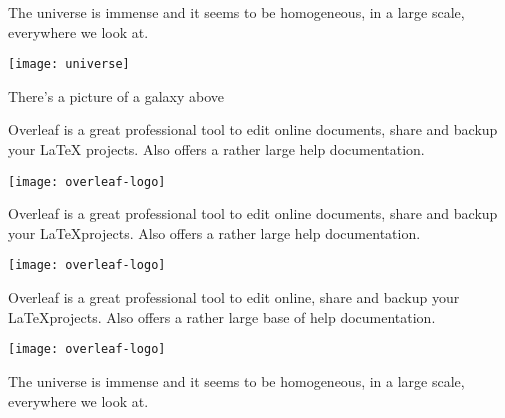 \documentclass{article}
\begin{document}
The universe is immense and it seems to be homogeneous, in a large scale, everywhere we look at.

\texttt{[image: universe]}

There's a picture of a galaxy above

\vspace{1.5cm}

Overleaf is a great professional tool to edit online documents, 
share and backup your \LaTeX{} projects. Also offers a 
rather large help documentation.\vspace{1cm}

\texttt{[image: overleaf-logo]}

\newpage

Overleaf is a great professional tool to edit online documents, 
share and backup your \LaTeX projects. Also offers a 
rather large help documentation.\vspace{1cm}

\texttt{[image: overleaf-logo]}

\vspace{1.5cm}

Overleaf is a great professional tool to edit online, 
share and backup your \LaTeX projects. Also offers a 
rather large base of help documentation.

\texttt{[image: overleaf-logo]}

\newpage

The universe is immense and it seems to be homogeneous, in a large scale, everywhere we look at.
\end{document}
